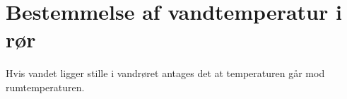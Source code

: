 \section{Bestemmelse af vandtemperatur i rør}
 Hvis vandet ligger stille i vandrøret antages det at temperaturen går mod rumtemperaturen. 